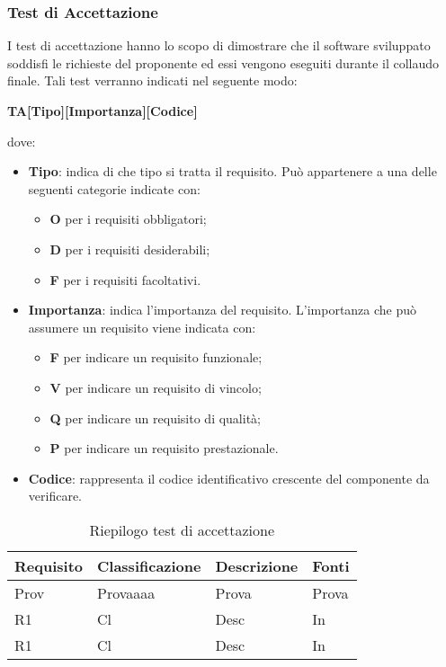 \subsubsection{Test di Accettazione}
I test di accettazione hanno lo scopo di dimostrare che il software sviluppato 
soddisfi le richieste del proponente ed essi vengono eseguiti durante il
collaudo finale. Tali test verranno indicati nel seguente modo: \\
	\centerline{\textbf{TA[Tipo][Importanza][Codice]}}
dove:
\begin{itemize}
	\item \textbf{Tipo}: indica di che tipo si tratta il requisito. Può
		appartenere a una delle seguenti categorie indicate con:
		\begin{itemize}
			\item \textbf{O} per i requisiti obbligatori;
			\item \textbf{D} per i requisiti desiderabili;
			\item \textbf{F} per i requisiti facoltativi.			
		\end{itemize}
	\item \textbf{Importanza}: indica l'importanza del requisito. L'importanza
		che può assumere un requisito viene indicata con:
		\begin{itemize}
			\item \textbf{F} per indicare un requisito funzionale;
			\item \textbf{V} per indicare un requisito di vincolo;
			\item \textbf{Q} per indicare un requisito di qualità;
			\item \textbf{P} per indicare un requisito prestazionale. 
		\end{itemize}
	\item \textbf{Codice}: rappresenta il codice identificativo crescente
		del componente da verificare.
\end{itemize}


\begin{table}[H]
	
	\begin{longtable}{ >{\centering}p{} >{\centering}p{}
			>{\centering}p{} >{\centering}p{}}
			
		\hline
		\rowcolorhead
		\textbf{\color{white}Requisito} 
		& \textbf{\color{white}Classificazione} 
		& \centering\textbf{\color{white}Descrizione}
		& \textbf{\color{white}Fonti} 
		\tabularnewline \hline 	
		
		
		Prov & Provaaaa & Prova & Prova 
		
		\tabularnewline 
		R1 & Cl & Desc & In 
		
		\tabularnewline 
		R1 & Cl & Desc & In
	
	
	\end{longtable}
	\caption{Riepilogo test di accettazione}	

\end{table}


